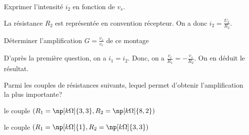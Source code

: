 \begin{enonce}
  Exprimer l'intensité \(i_{2}\) en fonction de \(v_{s}\).
\end{enonce}


\begin{corrige}
  La résistance \(R_{2}\) est représentée en convention récepteur. On a donc \(i_{2} = \frac{U_{2}}{R_{2}}\).
\end{corrige}




\begin{enonce}
  Déterminer l’amplification \(G = \frac{v_{s}}{v_{e}}\) de ce montage
\end{enonce}


\begin{corrige}
  D’après la première question, on a \(i_{1} = i_{2}\). Donc, on a \(\frac{v_{e}}{R_{1}} = -\frac{v_{s}}{R_{2}}\). On en déduit le résultat.
\end{corrige}


\medskip


\begin{enonce}
  Parmi les couples de résistances suivants, lequel permet d’obtenir l’amplification la plus importante?
  
  \smallskip
  
  \begin{listeQCM1Colonne}
  \item le couple \((R_{1} = \np[k\Omega]{3,3}, R_{2} = \np[k\Omega]{8,2})\)
  \item le couple  \((R_{1} = \np[k\Omega]{1}, R_{2} = \np[k\Omega]{3,3})\)
  \end{listeQCM1Colonne}
\end{enonce}

\reponse{\reponseB}



\finEntrainement


